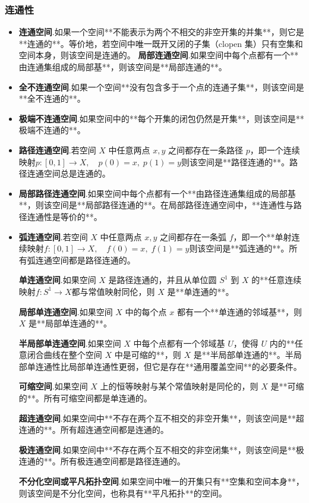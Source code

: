 \subsubsection{连通性}
\begin{itemize}
\item \textbf{连通空间}.如果一个空间**不能表示为两个不相交的非空开集的并集**，则它是**连通的**。等价地，若空间中唯一既开又闭的子集（clopen 集）只有空集和空间本身，则该空间是连通的。
\textbf{局部连通空间}.如果空间中每个点都有一个**由连通集组成的局部基**，则该空间是**局部连通的**。

\item \textbf{全不连通空间}.如果一个空间**没有包含多于一个点的连通子集**，则该空间是**全不连通的**。

\item \textbf{极端不连通空间}.如果空间中的**每个开集的闭包仍然是开集**，则该空间是**极端不连通的**。

\item \textbf{路径连通空间}.若空间 $X$ 中任意两点 $x, y$ 之间都存在一条路径 $p$，即一个连续映射$p: [0, 1] \to X,\quad p(0) = x,\; p(1) = y$则该空间是**路径连通的**。路径连通空间总是连通的。

\item \textbf{局部路径连通空间}.如果空间中每个点都有一个**由路径连通集组成的局部基**，则该空间是**局部路径连通的**。在局部路径连通空间中，**连通性与路径连通性是等价的**。

\item \textbf{弧连通空间}.若空间 $X$ 中任意两点 $x, y$ 之间都存在一条弧 $f$，即一个**单射连续映射$f: [0, 1] \to X,\quad f(0) = x,\; f(1) = y$则该空间是**弧连通的**。所有弧连通空间都是路径连通的。

\textbf{单连通空间}.如果空间 $X$ 是路径连通的，并且从单位圆 $S^1$ 到 $X$ 的**任意连续映射$f: S^1 \to X$都与常值映射同伦，则 $X$ 是**单连通的**。

\textbf{局部单连通空间}.如果空间 $X$ 中的每个点 $x$ 都有一个**单连通的邻域基**，则 $X$ 是**局部单连通的**。

\textbf{半局部单连通空间}.如果空间 $X$ 中每个点都有一个邻域基 $U$，使得 $U$ 内的**任意闭合曲线在整个空间 $X$ 中是可缩的**，则 $X$ 是**半局部单连通的**。半局部单连通性比局部单连通性更弱，但它是存在**通用覆盖空间**的必要条件。

\textbf{可缩空间}.如果空间 $X$ 上的恒等映射与某个常值映射是同伦的，则 $X$ 是**可缩的**。所有可缩空间都是单连通的。

\textbf{超连通空间}.如果空间中**不存在两个互不相交的非空开集**，则该空间是**超连通的**。所有超连通空间都是连通的。

\textbf{极连通空间}.如果空间中**不存在两个互不相交的非空闭集**，则该空间是**极连通的**。所有极连通空间都是路径连通的。

\textbf{不分化空间或平凡拓扑空间}.如果空间中唯一的开集只有**空集和空间本身**，则该空间是不分化空间，也称具有**平凡拓扑**的空间。

\end{itemize}